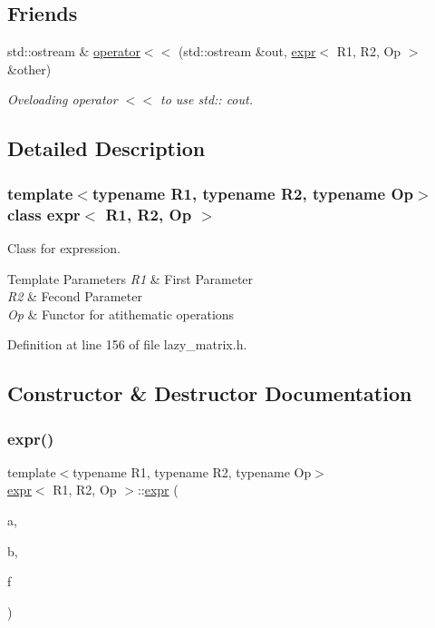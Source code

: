 \subsection*{Friends}
\begin{DoxyCompactItemize}
\item 
std\+::ostream \& \mbox{\hyperlink{classexpr_a2298d0a57665feadc1e35ac9df610dc8}{operator$<$$<$}} (std\+::ostream \&out, \mbox{\hyperlink{classexpr}{expr}}$<$ R1, R2, Op $>$ \&other)
\begin{DoxyCompactList}\small\item\em Oveloading operator $<$$<$ to use std\+:\+: cout. \end{DoxyCompactList}\end{DoxyCompactItemize}


\subsection{Detailed Description}
\subsubsection*{template$<$typename R1, typename R2, typename Op$>$\newline
class expr$<$ R1, R2, Op $>$}

Class for expression. 


\begin{DoxyTemplParams}{Template Parameters}
{\em R1} & First Parameter \\
\hline
{\em R2} & Fecond Parameter \\
\hline
{\em Op} & Functor for atithematic operations \\
\hline
\end{DoxyTemplParams}


Definition at line 156 of file lazy\+\_\+matrix.\+h.



\subsection{Constructor \& Destructor Documentation}
\mbox{\label{classexpr_a88ac75b254c2838f389ad61101abb7f4}} 
\subsubsection{\texorpdfstring{expr()}{expr()}}
{\footnotesize\ttfamily template$<$typename R1, typename R2, typename Op$>$ \\
\mbox{\hyperlink{classexpr}{expr}}$<$ R1, R2, Op $>$\+::\mbox{\hyperlink{classexpr}{expr}} (\begin{DoxyParamCaption}\item[{const R1 \&}]{a,  }\item[{const R2 \&}]{b,  }\item[{Op}]{f }\end{DoxyParamCaption})\hspace{0.3cm}{\ttfamily [inline]}}



